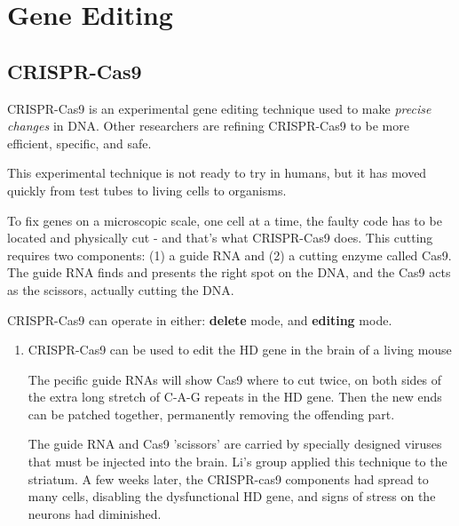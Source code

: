 \chapter{Gene Editing}


\section{CRISPR-Cas9}
\label{sec:CRISPR-Cas9}


CRISPR-Cas9 is an experimental gene editing technique used to make {\it precise
changes} in DNA. Other researchers are refining CRISPR-Cas9 to be more
efficient, specific, and safe.

This experimental technique is not ready to try in humans, but it has moved
quickly from test tubes to living cells to organisms.

To fix genes on a microscopic scale, one cell at a time, the faulty code has to
be located and physically cut - and that's what CRISPR-Cas9 does.
This cutting requires two components: (1) a guide RNA and (2) a cutting enzyme
called Cas9. The guide RNA finds and presents the right spot on the DNA, and
the Cas9 acts as the scissors, actually cutting the DNA.

CRISPR-Cas9 can operate in either: {\bf delete} mode, and {\bf editing} mode.



\begin{enumerate}
  \item   CRISPR-Cas9 can be used to edit the HD gene in the brain of a living
  mouse
  
  The pecific guide RNAs will show Cas9 where to cut twice, on both sides
  of the extra long stretch of C-A-G repeats in the HD gene. Then the new ends can
  be patched together, permanently removing the offending part.   
  
  The guide RNA and Cas9 'scissors' are carried by specially designed viruses
  that must be injected into the brain. Li's group applied this technique to the
  striatum. A few weeks later, the CRISPR-cas9 components had spread to many
  cells, disabling the dysfunctional HD gene, and signs of stress on the neurons
  had diminished.
  
  
  
\end{enumerate}
